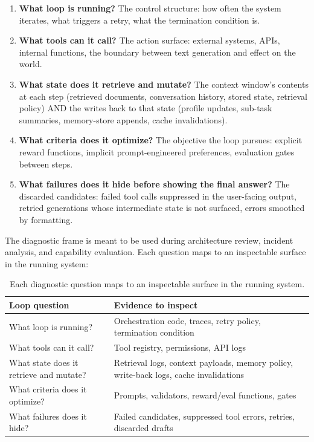 \documentclass[11pt,a4paper]{article}
\begin{document}
\begin{enumerate}
  \item \textbf{What loop is running?} The control structure: how often the system iterates, what triggers a retry, what the termination condition is.
  \item \textbf{What tools can it call?} The action surface: external systems, APIs, internal functions, the boundary between text generation and effect on the world.
  \item \textbf{What state does it retrieve and mutate?} The context window's contents at each step (retrieved documents, conversation history, stored state, retrieval policy) AND the writes back to that state (profile updates, sub-task summaries, memory-store appends, cache invalidations).
  \item \textbf{What criteria does it optimize?} The objective the loop pursues: explicit reward functions, implicit prompt-engineered preferences, evaluation gates between steps.
  \item \textbf{What failures does it hide before showing the final answer?} The discarded candidates: failed tool calls suppressed in the user-facing output, retried generations whose intermediate state is not surfaced, errors smoothed by formatting.
\end{enumerate}

The diagnostic frame is meant to be used during architecture review, incident analysis, and capability evaluation. Each question maps to an inspectable surface in the running system:

\begin{table}[t]
  \centering
  \footnotesize
  \begin{tabular}{p{4.5cm}p{8cm}}
    \toprule
    \textbf{Loop question} & \textbf{Evidence to inspect} \\
    \midrule
    What loop is running? & Orchestration code, traces, retry policy, termination condition \\
    \addlinespace
    What tools can it call? & Tool registry, permissions, API logs \\
    \addlinespace
    What state does it retrieve and mutate? & Retrieval logs, context payloads, memory policy, write-back logs, cache invalidations \\
    \addlinespace
    What criteria does it optimize? & Prompts, validators, reward/eval functions, gates \\
    \addlinespace
    What failures does it hide? & Failed candidates, suppressed tool errors, retries, discarded drafts \\
    \bottomrule
  \end{tabular}
  \caption{Each diagnostic question maps to an inspectable surface in the running system.}
  \label{tab:checklist}
\end{table}
\end{document}
